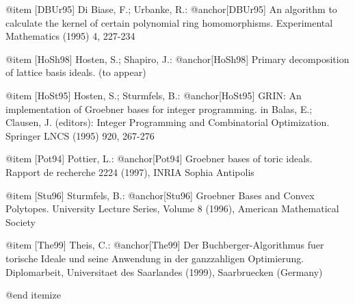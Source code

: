 @item [DBUr95]  Di Biase, F.; Urbanke, R.: @anchor{[DBUr95]}
   An algorithm to calculate the kernel of certain polynomial ring
   homomorphisms.
   Experimental Mathematics (1995) 4, 227-234

@item [HoSh98]  Hosten, S.; Shapiro, J.: @anchor{[HoSh98]}
   Primary decomposition of lattice basis ideals.
   (to appear)

@item [HoSt95]  Hosten, S.; Sturmfels, B.: @anchor{[HoSt95]}
   GRIN: An implementation of Groebner bases for integer programming.
   in Balas, E.; Clausen, J. (editors): Integer Programming and
   Combinatorial Optimization.
   Springer LNCS (1995) 920, 267-276

@item [Pot94]  Pottier, L.: @anchor{[Pot94]}
   Groebner bases of toric ideals.
   Rapport de recherche 2224 (1997), INRIA Sophia Antipolis

@item [Stu96]  Sturmfels, B.: @anchor{[Stu96]}
   Groebner Bases and Convex Polytopes.
   University Lecture Series, Volume 8 (1996), American Mathematical
   Society

@item [The99]  Theis, C.: @anchor{[The99]}
   Der Buchberger-Algorithmus fuer torische Ideale und seine Anwendung
   in der ganzzahligen Optimierung.
   Diplomarbeit, Universitaet des Saarlandes (1999), Saarbruecken
   (Germany)

@end itemize
